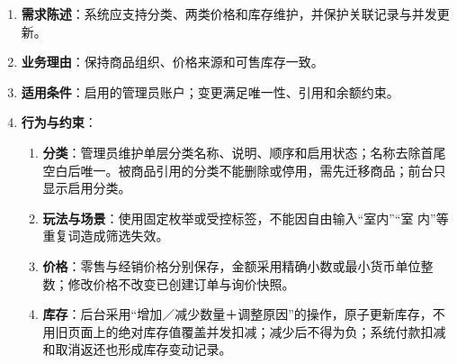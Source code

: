 \begin{enumerate}
\item {\bfseries 需求陈述}：系统应支持分类、两类价格和库存维护，并保护关联记录与并发更新。
\item {\bfseries 业务理由}：保持商品组织、价格来源和可售库存一致。
\item {\bfseries 适用条件}：启用的管理员账户；变更满足唯一性、引用和余额约束。
\item {\bfseries 行为与约束}：
\begin{enumerate}
\item {\bfseries 分类}：管理员维护单层分类名称、说明、顺序和启用状态；名称去除首尾空白后唯一。被商品引用的分类不能删除或停用，需先迁移商品；前台只显示启用分类。
\item {\bfseries 玩法与场景}：使用固定枚举或受控标签，不能因自由输入“室内”“室 内”等重复词造成筛选失效。
\item {\bfseries 价格}：零售与经销价格分别保存，金额采用精确小数或最小货币单位整数；修改价格不改变已创建订单与询价快照。
\item {\bfseries 库存}：后台采用“增加／减少数量＋调整原因”的操作，原子更新库存，不用旧页面上的绝对库存值覆盖并发扣减；减少后不得为负；系统付款扣减和取消返还也形成库存变动记录。
\end{enumerate}

\end{enumerate}


